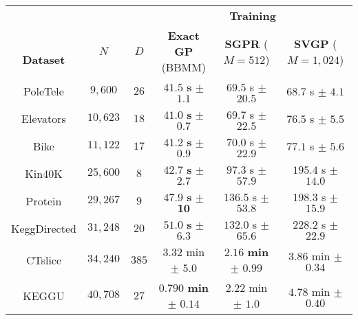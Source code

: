 \begin{tabular}{ cccccc }
  \toprule
  &&& \multicolumn{3}{c}{{\bf Training}}\\
  \cline{4-6}
  \thead{\\{\bf Dataset}} & $N$ & $D$ &
  \thead{{\bf Exact GP} \\ (BBMM)} &
  \thead{{\bf SGPR} \\ ($M\!=\!512$)} &
  \thead{{\bf SVGP} \\ ($M\!=\!1,\!024$)}
  \\
  \midrule
  PoleTele             & $9,\!600$          & $26$  &      $\mathbf{41.5}$ {\bf s}   $\mathbf{\pm}$ $\mathbf{1.1}$  &               $69.5$ s         $\pm$ $20.5$                     &       $68.7$ s   $\pm$ $4.1$    \\
	Elevators            & $10,\!623$         & $18$  &      $\mathbf{41.0}$ {\bf s}   $\mathbf{\pm}$ $\mathbf{0.7}$  &               $69.7$ s         $\pm$ $22.5$                     &       $76.5$ s   $\pm$ $5.5$    \\
	Bike                 & $11,\!122$         & $17$  &      $\mathbf{41.2}$ {\bf s}   $\mathbf{\pm}$ $\mathbf{0.9}$  &               $70.0$ s         $\pm$ $22.9$                     &       $77.1$ s   $\pm$ $5.6$    \\
	Kin40K               & $25,\!600$         & $8$   &      $\mathbf{42.7}$ {\bf s}   $\mathbf{\pm}$ $\mathbf{2.7}$  &               $97.3$ s         $\pm$ $57.9$                     &      $195.4$ s   $\pm$ $14.0$   \\
	Protein              & $29,\!267$         & $9$   &      $\mathbf{47.9}$ {\bf s}   $\mathbf{\pm}$ $\mathbf{10 }$  &              $136.5$ s         $\pm$ $53.8$                     &      $198.3$ s   $\pm$ $15.9$   \\
	KeggDirected         & $31,\!248$         & $20$  &      $\mathbf{51.0}$ {\bf s}   $\mathbf{\pm}$ $\mathbf{6.3}$  &              $132.0$ s         $\pm$ $65.6$                     &      $228.2$ s   $\pm$ $22.9$   \\
  CTslice              & $34,\!240$         & $385$ &               $3.32$ min       $\pm$ $5.0$                    &      $\mathbf{2.16}$ {\bf min} $\mathbf{\pm}$ $\mathbf{0.99}$   &       $3.86$ min $\pm$ $0.34$   \\
  KEGGU                & $40,\!708$         & $27$  &     $\mathbf{0.790}$ {\bf min} $\mathbf{\pm}$ $\mathbf{0.14}$ &               $2.22$ min       $\pm$ $1.0$                      &       $4.78$ min $\pm$ $0.40$   \\

\end{tabular}
